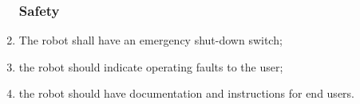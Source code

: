 \begin{enumerate}
            \subsubsection{Safety}
            \item The robot shall have an emergency shut-down switch; \label{spec: kill switch}
            \item the robot should indicate operating faults to the user; \label{spec: error indicator}
            \item the robot should have documentation and instructions for end users. \label{spec: documentation}
        \end{enumerate}
